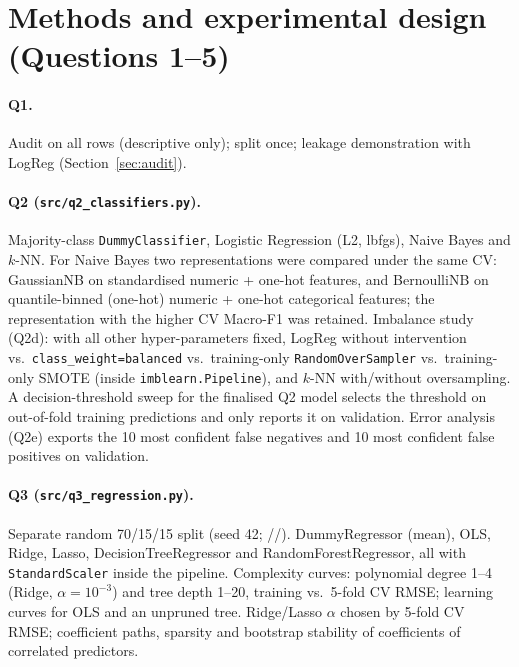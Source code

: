 \section{Methods and experimental design (Questions 1--5)}
\label{sec:methods}

\paragraph{Q1.} Audit on all rows (descriptive only); split once; leakage demonstration with LogReg (Section~\ref{sec:audit}).

\paragraph{Q2 (\texttt{src/q2\_classifiers.py}).} Majority-class \texttt{DummyClassifier}, Logistic Regression
(L2, lbfgs), Naive Bayes and $k$-NN. For Naive Bayes two representations were compared under the same CV:
GaussianNB on standardised numeric + one-hot features, and BernoulliNB on quantile-binned (one-hot) numeric +
one-hot categorical features; the representation with the higher CV Macro-F1 was retained. Imbalance study
(Q2d): with all other hyper-parameters fixed, LogReg without intervention vs.\ \texttt{class\_weight=balanced}
vs.\ training-only \texttt{RandomOverSampler} vs.\ training-only SMOTE (inside \texttt{imblearn.Pipeline}), and
$k$-NN with/without oversampling. A decision-threshold sweep for the finalised Q2 model selects the threshold
on out-of-fold training predictions and only reports it on validation. Error analysis (Q2e) exports the 10 most
confident false negatives and 10 most confident false positives on validation.

\paragraph{Q3 (\texttt{src/q3\_regression.py}).} Separate random 70/15/15 split (seed 42; \RegNTrain/\RegNVal/\RegNTest).
DummyRegressor (mean), OLS, Ridge, Lasso, DecisionTreeRegressor and RandomForestRegressor, all with
\texttt{StandardScaler} inside the pipeline. Complexity curves: polynomial degree 1--4 (Ridge, $\alpha=10^{-3}$)
and tree depth 1--20, training vs.\ 5-fold CV RMSE; learning curves for OLS and an unpruned tree. Ridge/Lasso
$\alpha$ chosen by 5-fold CV RMSE; coefficient paths, sparsity and bootstrap stability of coefficients of
correlated predictors.

